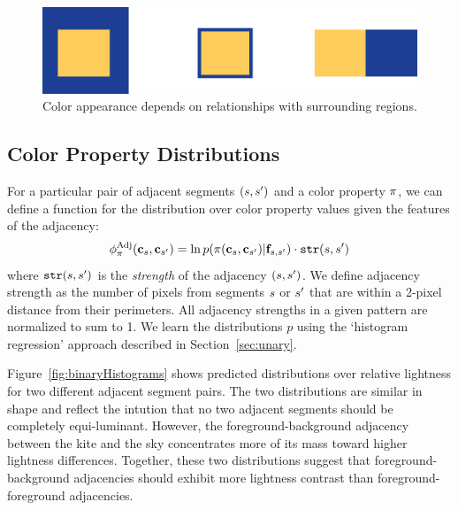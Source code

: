 \begin{figure}[ht]
\centering
\includegraphics[width=.7\columnwidth]{figs/surround}
\caption{Color appearance depends on relationships with surrounding regions.}
\label{fig:surround}
\end{figure}

\subsection{Color Property Distributions}
\label{sec:binaryDistribs}

For a particular pair of adjacent segments $(s, {s^{\prime}})$ and a color property $\pi$, we can define a function for the distribution over color property values given the features of the adjacency:
\begin{equation*}
\phi^{\textrm{Adj}}_\pi(\mathbf{c}_s, \mathbf{c}_{s^{\prime}}) = \ln p( \pi( \mathbf{c}_s, \mathbf{c}_{s^{\prime}} ) | \mathbf{f}_{s, {s^{\prime}}} ) \cdot \texttt{str}(s, {s^{\prime}})
\end{equation*}
where $\texttt{str}(s,{s^{\prime}})$ is the \emph{strength} of the adjacency $(s,{s^{\prime}})$. We define adjacency strength as the number of pixels from segments $s$ or ${s^{\prime}}$ that are within a 2-pixel distance from their perimeters. All adjacency strengths in a given pattern are normalized to sum to 1. We learn the distributions $p$ using the `histogram regression' approach described in Section~\ref{sec:unary}.

Figure~\ref{fig:binaryHistograms} shows predicted distributions over relative lightness for two different adjacent segment pairs. The two distributions are similar in shape and reflect the intution that no two adjacent segments should be completely equi-luminant. However, the foreground-background adjacency between the kite and the sky concentrates more of its mass toward higher lightness differences. Together, these two distributions suggest that foreground-background adjacencies should exhibit more lightness contrast than foreground-foreground adjacencies.

